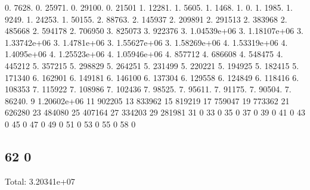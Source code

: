 0. 7628. 0. 25971. 0. 29100. 0. 21501 1. 12281. 1. 5605. 1. 1468. 1. 0. 1. 1985. 1. 9249. 1. 24253. 1. 50155. 2. 88763. 2. 145937 2. 209891 2. 291513 2. 383968 2. 485668 2. 594178 2. 706950 3. 825073 3. 922376 3. 1.\+04539e+06 3. 1.\+18107e+06 3. 1.\+33742e+06 3. 1.\+4781e+06 3. 1.\+55627e+06 3. 1.\+58269e+06 4. 1.\+53319e+06 4. 1.\+4095e+06 4. 1.\+25523e+06 4. 1.\+05946e+06 4. 857712 4. 686608 4. 548475 4. 445212 5. 357215 5. 298829 5. 264251 5. 231499 5. 220221 5. 194925 5. 182415 5. 171340 6. 162901 6. 149181 6. 146100 6. 137304 6. 129558 6. 124849 6. 118416 6. 108353 7. 115922 7. 108986 7. 102436 7. 98525. 7. 95611. 7. 91175. 7. 90504. 7. 86240. 9 1.\+20602e+06 11 902205 13 833962 15 819219 17 759047 19 773362 21 626280 23 484080 25 407164 27 334203 29 281981 31 0 33 0 35 0 37 0 39 0 41 0 43 0 45 0 47 0 49 0 51 0 53 0 55 0 58 0 \subsection*{62 0 }

Total\+: 3.\+20341e+07 